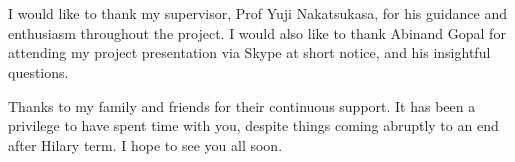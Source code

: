 \section*{}

I would like to thank my supervisor, Prof Yuji Nakatsukasa, for his guidance and enthusiasm throughout the project. I would also like to thank Abinand Gopal for attending my project presentation via Skype at short notice, and his insightful questions.

\bigskip{}

Thanks to my family and friends for their continuous support. It has been a privilege to have spent time with you, despite things coming abruptly to an end after Hilary term. I hope to see you all soon.